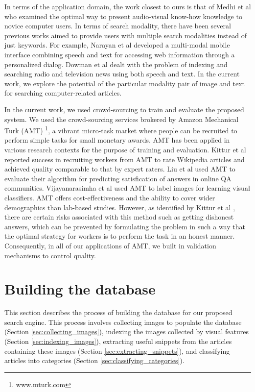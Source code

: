 \documentclass{www2010-submission}
\begin{document}
In terms of the application domain, the work closest to ours is that
of Medhi et al \cite{Medhi} who examined the optimal way to present
audio-visual know-how knowledge to novice computer users.  In terms of
search modality, there have been several previous works aimed to
provide users with multiple search modalities instead of just
keywords. For example, Narayan et al \cite{Narayan} developed a
multi-modal mobile interface combining speech and text for accessing
web information through a personalized dialog.  Dowman et al
\cite{Dowman} dealt with the problem of indexing and searching radio
and television news using both speech and text. In the current work,
we explore the potential of the particular modality pair of image and
text for searching computer-related articles.


In the current work, we used crowd-sourcing to train and evaluate the
proposed system.  We used the crowd-sourcing services brokered by
Amazon Mechanical Turk (AMT) \footnote{www.mturk.com}, a vibrant micro-task market where people
can be recruited to perform simple tasks for small monetary
awards. AMT has been applied in various research contexts for the
purpose of training and evaluation. Kittur et al \cite{Kittur}
reported success in recruiting workers from AMT to rate Wikipedia
articles and achieved quality comparable to that by expert raters.
Liu et al \cite{Liu} used AMT to evaluate their algorithm for
predicting satisfication of answers in online QA
communities. Vijayanarasimha et al \cite{Vijayanarasimha} used AMT to label images for
learning visual classifiers.  AMT offers cost-effectiveness and the ability
to cover wider demographics than lab-based studies. However, as
identified by Kittur et al \cite{Kittur}, there are certain risks associated with
this method such as getting dishonest answers, which can be prevented by
formulating the problem in such a way that the optimal strategy for workers is to
perform the task in an honest manner. Consequently, in all of our
applications of AMT, we built in validation mechanisms to control
quality.

\section{Building the database}
\label{sec:building}

This section describes the process of building the database for
our proposed search engine. This process involves collecting
images to populate the database (Section \ref{sec:collecting_images}),
indexing the images collected by visual features (Section
\ref{sec:indexing_images}), extracting useful snippets from the
articles containing these images (Section
\ref{sec:extracting_snippets}),
and classifying articles into categories (Section \ref{sec:classifying_categories}).
\end{document}
